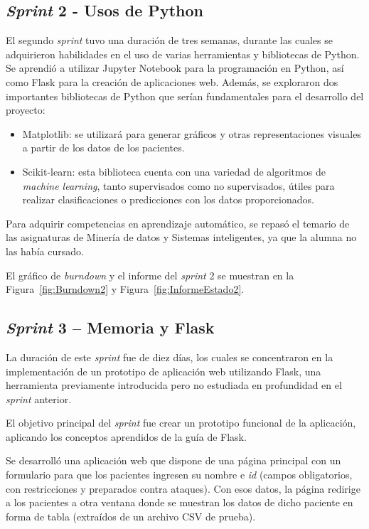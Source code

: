 \subsection{\textit{Sprint} 2 - Usos de Python}
El segundo \textit{sprint} tuvo una duración de tres semanas, durante las cuales se adquirieron habilidades en el uso de varias herramientas y bibliotecas de Python. Se aprendió a utilizar Jupyter Notebook para la programación en Python, así como Flask para la creación de aplicaciones web. Además, se exploraron dos importantes bibliotecas de Python que serían fundamentales para el desarrollo del proyecto:
\begin{itemize}
    \item Matplotlib: se utilizará para generar gráficos y otras representaciones visuales a partir de los datos de los pacientes.
    \item Scikit-learn: esta biblioteca cuenta con una variedad de algoritmos de \textit{machine learning}, tanto supervisados como no supervisados, útiles para realizar clasificaciones o predicciones con los datos proporcionados.
\end{itemize}
Para adquirir competencias en aprendizaje automático, se repasó el temario de las asignaturas de Minería de datos y Sistemas inteligentes, ya que la alumna no las había cursado.

El gráfico de \textit{burndown} y el informe del \textit{sprint} 2 se muestran en la Figura~\ref{fig:Burndown2} y Figura~\ref{fig:InformeEstado2}.


\subsection{\textit{Sprint} 3 – Memoria y Flask}
La duración de este \textit{sprint} fue de diez días, los cuales se concentraron en la implementación de un prototipo de aplicación web utilizando Flask, una herramienta previamente introducida pero no estudiada en profundidad en el \textit{sprint} anterior.

El objetivo principal del \textit{sprint} fue crear un prototipo funcional de la aplicación, aplicando los conceptos aprendidos de la guía de Flask. 

Se desarrolló una aplicación web que dispone de una página principal con un formulario para que los pacientes ingresen su nombre e \textit{id} (campos obligatorios, con restricciones y preparados contra ataques). Con esos datos, la página redirige a los pacientes a otra ventana donde se muestran los datos de dicho paciente en forma de tabla (extraídos de un archivo CSV de prueba).

